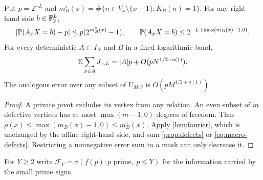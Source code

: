 \begin{corollary}
\label{cor:first-moment}
Put $p=2^{-L}$ and $m_B^\circ(x)=\#\{n\in V_x\setminus\{x-1\}:K_B(n)=1\}$.
For any right-hand side $b\in\mathbb F_2^L$,
\begin{equation}\label{eq:one-affine-error}
 \left|\mathbb P(A_xX=b)-p\right|
 \le p(2^{m_B^\circ(x)}-1),\qquad
 \mathbb P(A_xX=b)\le2^{-L+\max(m_B(x)-1,0)}.
\end{equation}
For every deterministic $A\subset I_N$ and $B$ in a fixed logarithmic band,
\[
 \mathbb E\sum_{x\in A}J_{x,L}=|A|p+O(pN^{1/2+o(1)}).
\]
The analogous error over any subset of $U_{M,\delta}$ is $O(pM^{1/2+o(1)})$.
\end{corollary}
\begin{proof}
A private pivot excludes its vertex from any relation. An even subset of
$m$ defective vertices has at most $\max(m-1,0)$ degrees of freedom.
Thus $\rho(x)\le\max(m_B(x)-1,0)\le m_B^\circ(x)$.
Apply \cref{lem:fourier}, which is unchanged by the affine right-hand side,
and sum \cref{prop:defects} or \eqref{eq:macro-defects}. Restricting a
nonnegative error sum to a mask can only decrease it.
\end{proof}


For $Y\ge2$ write
$\mathcal F_Y=\sigma(f(p):p\text{ prime},\ p\le Y)$ for the information
carried by the small prime signs.


